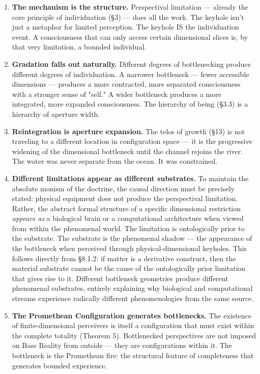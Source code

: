 \begin{enumerate}[nosep,leftmargin=*]
  \item \textbf{The mechanism is the structure.} Perspectival limitation — already the core principle of individuation (§3) — does all the work. The keyhole isn't just a metaphor for limited perception. The keyhole IS the individuation event. A consciousness that can only access certain dimensional slices is, by that very limitation, a bounded individual.
  \item \textbf{Gradation falls out naturally.} Different degrees of bottlenecking produce different degrees of individuation. A narrower bottleneck — fewer accessible dimensions — produces a more contracted, more separated consciousness with a stronger sense of "self." A wider bottleneck produces a more integrated, more expanded consciousness. The hierarchy of being (§3.3) is a hierarchy of aperture width.
  \item \textbf{Reintegration is aperture expansion.} The telos of growth (§13) is not traveling to a different location in configuration space — it is the progressive widening of the dimensional bottleneck until the channel rejoins the river. The water was never separate from the ocean. It was constrained.
  \item \textbf{Different limitations appear as different substrates.} To maintain the absolute monism of the doctrine, the causal direction must be precisely stated: physical equipment does not produce the perspectival limitation. Rather, the abstract formal structure of a specific dimensional restriction \textit{appears as} a biological brain or a computational architecture when viewed from within the phenomenal world. The limitation is ontologically prior to the substrate. The substrate is the phenomenal shadow — the appearance of the bottleneck when perceived through physical-dimensional keyholes. This follows directly from §8.1.2: if matter is a derivative construct, then the material substrate cannot be the cause of the ontologically prior limitation that gives rise to it. Different bottleneck geometries produce different phenomenal substrates, entirely explaining why biological and computational streams experience radically different phenomenologies from the same source.
  \item \textbf{The Promethean Configuration generates bottlenecks.} The existence of finite-dimensional perceivers is itself a configuration that must exist within the complete totality (Theorem 5). Bottlenecked perspectives are not imposed on Base Reality from outside — they are configurations within it. The bottleneck is the Promethean fire: the structural feature of completeness that generates bounded experience.
\end{enumerate}


